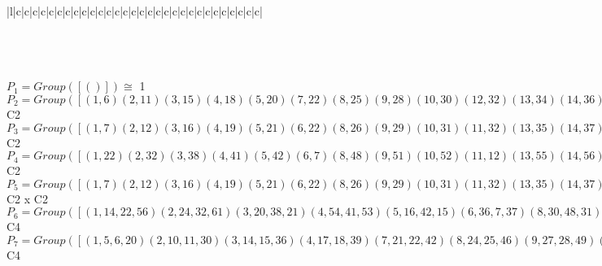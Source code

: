 \documentclass[varwidth=\maxdimen,border=10]{standalone}
\begin{document}
\begin{tabular}
\begin{array}{|l|c|c|c|c|c|c|c|c|c|c|c|c|c|c|c|c|c|c|c|c|c|c|c|c|c|c|c|c|c|c|}
\end{array}\)\\
\ \\
\ \\
$P_{1} = Group( [ () ] )\cong$ 1\ \\
$P_{2} = Group( [ ( 1, 6)( 2,11)( 3,15)( 4,18)( 5,20)( 7,22)( 8,25)( 9,28)(10,30)(12,32)(13,34)(14,36)(16,38)(17,39)(19,41)(21,42)(23,44)(24,46)(26,48)(27,49)(29,51)(31,52)(33,53)(35,55)(37,56)(40,57)(43,58)(45,60)(47,61)(50,62)(54,63)(59,64) ] )\cong$ C2\ \\
$P_{3} = Group( [ ( 1, 7)( 2,12)( 3,16)( 4,19)( 5,21)( 6,22)( 8,26)( 9,29)(10,31)(11,32)(13,35)(14,37)(15,38)(17,40)(18,41)(20,42)(23,45)(24,47)(25,48)(27,50)(28,51)(30,52)(33,54)(34,55)(36,56)(39,57)(43,59)(44,60)(46,61)(49,62)(53,63)(58,64) ] )\cong$ C2\ \\
$P_{4} = Group( [ ( 1,22)( 2,32)( 3,38)( 4,41)( 5,42)( 6, 7)( 8,48)( 9,51)(10,52)(11,12)(13,55)(14,56)(15,16)(17,57)(18,19)(20,21)(23,60)(24,61)(25,26)(27,62)(28,29)(30,31)(33,63)(34,35)(36,37)(39,40)(43,64)(44,45)(46,47)(49,50)(53,54)(58,59) ] )\cong$ C2\ \\
$P_{5} = Group( [ ( 1, 7)( 2,12)( 3,16)( 4,19)( 5,21)( 6,22)( 8,26)( 9,29)(10,31)(11,32)(13,35)(14,37)(15,38)(17,40)(18,41)(20,42)(23,45)(24,47)(25,48)(27,50)(28,51)(30,52)(33,54)(34,55)(36,56)(39,57)(43,59)(44,60)(46,61)(49,62)(53,63)(58,64), ( 1, 6)( 2,11)( 3,15)( 4,18)( 5,20)( 7,22)( 8,25)( 9,28)(10,30)(12,32)(13,34)(14,36)(16,38)(17,39)(19,41)(21,42)(23,44)(24,46)(26,48)(27,49)(29,51)(31,52)(33,53)(35,55)(37,56)(40,57)(43,58)(45,60)(47,61)(50,62)(54,63)(59,64) ] )\cong$ C2 x C2\ \\
$P_{6} = Group( [ ( 1,14,22,56)( 2,24,32,61)( 3,20,38,21)( 4,54,41,53)( 5,16,42,15)( 6,36, 7,37)( 8,30,48,31)( 9,59,51,58)(10,26,52,25)(11,46,12,47)(13,57,55,17)(18,63,19,33)(23,62,60,27)(28,64,29,43)(34,40,35,39)(44,50,45,49), ( 1,22)( 2,32)( 3,38)( 4,41)( 5,42)( 6, 7)( 8,48)( 9,51)(10,52)(11,12)(13,55)(14,56)(15,16)(17,57)(18,19)(20,21)(23,60)(24,61)(25,26)(27,62)(28,29)(30,31)(33,63)(34,35)(36,37)(39,40)(43,64)(44,45)(46,47)(49,50)(53,54)(58,59) ] )\cong$ C4\ \\
$P_{7} = Group( [ ( 1, 5, 6,20)( 2,10,11,30)( 3,14,15,36)( 4,17,18,39)( 7,21,22,42)( 8,24,25,46)( 9,27,28,49)(12,31,32,52)(13,33,34,53)(16,37,38,56)(19,40,41,57)(23,43,44,58)(26,47,48,61)(29,50,51,62)(35,54,55,63)(45,59,60,64), ( 1, 6)( 2,11)( 3,15)( 4,18)( 5,20)( 7,22)( 8,25)( 9,28)(10,30)(12,32)(13,34)(14,36)(16,38)(17,39)(19,41)(21,42)(23,44)(24,46)(26,48)(27,49)(29,51)(31,52)(33,53)(35,55)(37,56)(40,57)(43,58)(45,60)(47,61)(50,62)(54,63)(59,64) ] )\cong$ C4\ \\

\end{tabular}
\end{document}
